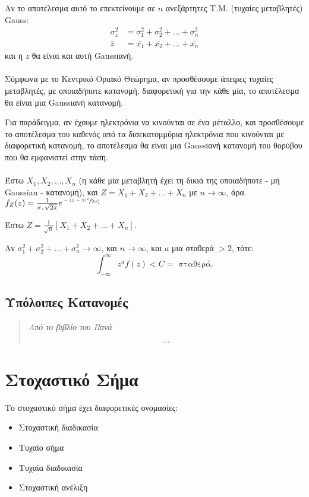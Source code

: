 \documentclass[11pt,a4paper,notitlepage,fleqn,final]{article}
\begin{document}
Αν το αποτέλεσμα αυτό το επεκτείνουμε σε \( n \) ανεξάρτητες Τ.Μ.
(τυχαίες μεταβλητές) Gauss:
\begin{align*}
	\sigma_z^2 &= \sigma_1^2+\sigma_2^2+\dots+\sigma_n^2 \\
	\bar z &= \bar{x_1} + \bar{x_2} + \dots + \bar{x_n}
\end{align*}
και η \( z \) θα είναι και αυτή Gaussιανή.

\paragraph{}
Σύμφωνα με το Κεντρικό Οριακό Θεώρημα, αν προσθέσουμε άπειρες τυχαίες
μεταβλητές, με οποιαδήποτε κατανομή, διαφορετική για την κάθε μία, το
αποτέλεσμα θα είναι μια Gaussιανή κατανομή.

Για παράδειγμα, αν έχουμε ηλεκτρόνια να κινούνται σε ένα μέταλλο, και
προσθέσουμε το αποτέλεσμα του καθενός από τα δισεκατομμύρια ηλεκτρόνια
που κινούνται με διαφορετική κατανομή, το αποτέλεσμα θα είναι μια
Gaussιανή κατανομή του θορύβου που θα εμφανιστεί στην τάση.

\paragraph{}
Έστω \( X_1,X_2,\dots,X_n \) (η κάθε μία μεταβλητή έχει τη δικιά της
οποιαδήποτε - μη Gaussian - κατανομή), και \( Z = X_1+X_2+\dots+X_n \) με
\( n\to \infty \), άρα \( f_Z(z)
= \frac{1}{\sigma_z\sqrt{2\pi}} e^{\sfrac{-(z-\bar z)^2}{2\sigma_2^2} }
\)

Έστω
\( Z = \frac{1}{\sqrt{n}} \left[X_1+X_2+\dots+X_n\right]\).

Αν \( \sigma_1^2+\sigma_2^2+\dots+\sigma_n^2 \to \infty \), και
\( n\to \infty \), και \( a \) μια σταθερά \( >2 \), τότε:
\[
\int_{-\infty}^{\infty} z^a f(z) < C = \text{ σταθερά.}
\]

\subsection{Υπόλοιπες Κατανομές}
\begin{quote}
	\emph{Από το βιβλίο του Πανά}
	
	\[\cdots \]
\end{quote}

\newpage
\section{Στοχαστικό Σήμα}
Το στοχαστικό σήμα έχει διαφορετικές ονομασίες:
\begin{itemize}
	\item Στοχαστική διαδικασία
	\item Τυχαίο σήμα
	\item Τυχαία διαδικασία
	\item Στοχαστική ανέλιξη
\end{itemize}
\end{document}
